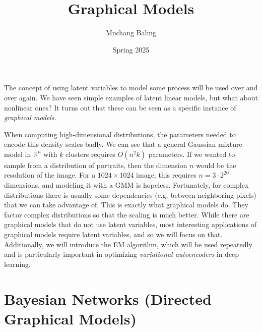 \documentclass{article}
\begin{document}

\title{Graphical Models}
\author{Muchang Bahng}
\date{Spring 2025}

\maketitle
\tableofcontents
\pagebreak

  The concept of using latent variables to model some process will be used over and over again. We have seen simple examples of latent linear models, but what about nonlinear ones? It turns out that these can be seen as a specific instance of \textit{graphical models}. 

  When computing high-dimensional distributions, the parameters needed to encode this density scales badly. We can see that a general Gaussian mixture model in $\mathbb{R}^n$ with $k$ clusters requires $O(n^2 k)$ parameters. If we wanted to sample from a distribution of portraits, then the dimension $n$ would be the resolution of the image. For a $1024 \times 1024$ image, this requires $n = 3 \cdot 2^{20}$ dimensions, and modeling it with a GMM is hopeless. Fortunately, for complex distributions there is usually some dependencies (e.g. between neighboring pixels) that we can take advantage of. This is exactly what graphical models do. They factor complex distributions so that the scaling is much better. While there are graphical models that do not use latent variables, most interesting applications of graphical models require latent variables, and so we will focus on that. Additionally, we will introduce the EM algorithm, which will be used repeatedly and is particularly important in optimizing \textit{variational autoencoders} in deep learning. 

\section{Bayesian Networks (Directed Graphical Models)} 
\end{document}
